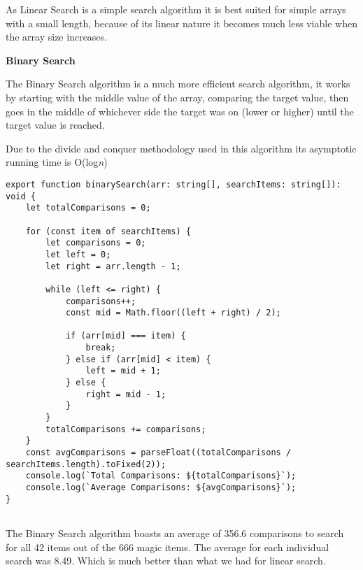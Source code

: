 \documentclass[12pt,letterpaper, onecolumn]{exam}
\begin{document}
\vspace{.2cm}

\centering As Linear Search is a simple search algorithm it is best suited for simple arrays with a small length, because of its linear nature it becomes much less viable when the array size increases. 

\newpage


\centering \textbf{Binary Search}

\vspace{.4cm}

\centering The Binary Search algorithm is a much more efficient search algorithm, it works by starting with the middle value of the array, comparing the target value, then goes in the middle of whichever side the target was on (lower or higher) until the target value is reached. 

\vspace{.2cm}
\centering Due to the divide and conquer methodology used in this algorithm its asymptotic running time is O(log\textit{n})

\vspace{.2cm}

\begin{lstlisting}
export function binarySearch(arr: string[], searchItems: string[]): void {
    let totalComparisons = 0;

    for (const item of searchItems) {
        let comparisons = 0;
        let left = 0;
        let right = arr.length - 1;

        while (left <= right) {
            comparisons++; 
            const mid = Math.floor((left + right) / 2);

            if (arr[mid] === item) {
                break;
            } else if (arr[mid] < item) {
                left = mid + 1;
            } else {
                right = mid - 1;
            }
        }
        totalComparisons += comparisons;
    }
    const avgComparisons = parseFloat((totalComparisons / searchItems.length).toFixed(2));
    console.log(`Total Comparisons: ${totalComparisons}`);
    console.log(`Average Comparisons: ${avgComparisons}`);
}


\end{lstlisting}

\vspace{.3cm}
\centering The Binary Search algorithm boasts an average of 356.6 comparisons to search for all 42 items out of the 666 magic items. The average for each individual search was 8.49. Which is much better than what we had for linear search.
\end{document}
